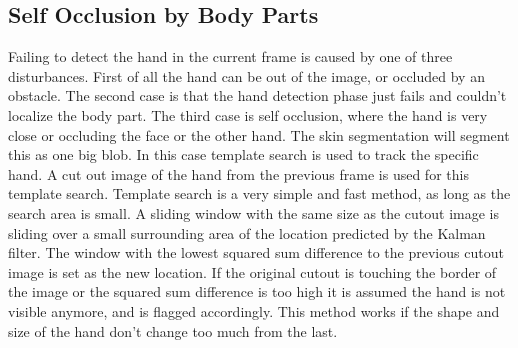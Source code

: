 







\subsection*{Self Occlusion by Body Parts}
Failing to detect the hand in the current frame is caused by one of three disturbances. First of all the hand can be out of the image, or occluded by an obstacle. The second case is that the hand detection phase just fails and couldn't localize the body part. The third case is self occlusion, where the hand is very close or occluding the face or the other hand. The skin segmentation will segment this as one big blob. In this case template search is used to track the specific hand. A cut out image of the hand from the previous frame is used for this template search. Template search is a very simple and fast method, as long as the search area is small. A sliding window  with the same size as the cutout image is sliding over a small surrounding area of the location predicted by the Kalman filter. The window with the lowest squared sum difference to the previous cutout image is set as the new location. If the original cutout is touching the border of the image or the squared sum difference is too high it is assumed the hand is not visible anymore, and is flagged accordingly. This method works if the shape and size of the hand don't change too much from the last.

